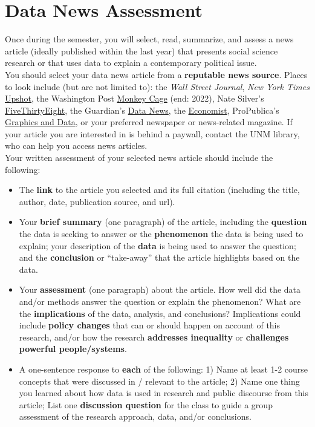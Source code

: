 \documentclass[11pt]{article}
\begin{document}
\clearpage

\section*{Data News Assessment}

\noindent Once during the semester, you will select, read, summarize, and assess a news article (ideally published within the last year) that presents social science research or that uses data to explain a contemporary political issue. \\

\noindent You should select your data news article from a \textbf{reputable news source}. Places to look include (but are not limited to): the \textit{Wall Street Journal}, \textit{New York Times} \href{https://www.nytimes.com/section/upshot}{Upshot}, the Washington Post \href{https://www.washingtonpost.com/monkey-cage/}{Monkey Cage} (end: 2022), Nate Silver's \href{https://fivethirtyeight.com/}{FiveThirtyEight}, the Guardian's \href{https://www.theguardian.com/data}{Data News}, the \href{https://www.economist.com/}{Economist}, ProPublica's \href{https://www.propublica.org//newsapps/}{Graphics and Data}, or your preferred newspaper or news-related magazine. If your article you are interested in is behind a paywall, contact the UNM library, who can help you access news articles.\\

\noindent Your written assessment of your selected news article should include the following:

\begin{itemize}
    \item The \textbf{link} to the article you selected and its full citation (including the title, author, date, publication source, and url).

    \item Your \textbf{brief summary} (one paragraph) of the article, including the \textbf{question} the data is seeking to answer or the \textbf{phenomenon} the data is being used to explain; your description of the \textbf{data} is being used to answer the question; and the \textbf{conclusion} or ``take-away'' that the article highlights based on the data.

    \item Your \textbf{assessment} (one paragraph) about the article. How well did the data and/or methods answer the question or explain the phenomenon? What are the \textbf{implications} of the data, analysis, and conclusions? Implications could include \textbf{policy changes} that can or should happen on account of this research, and/or how the research \textbf{addresses inequality} or \textbf{challenges powerful people/systems}.

    \item A one-sentence response to \textbf{each} of the following: 1) Name at least 1-2 course concepts that were discussed in / relevant to the article; 2) Name one thing you learned about how data is used in research and public discourse from this article; List one \textbf{discussion question} for the class to guide a group assessment of the research approach, data, and/or conclusions.
\end{itemize}
\end{document}
